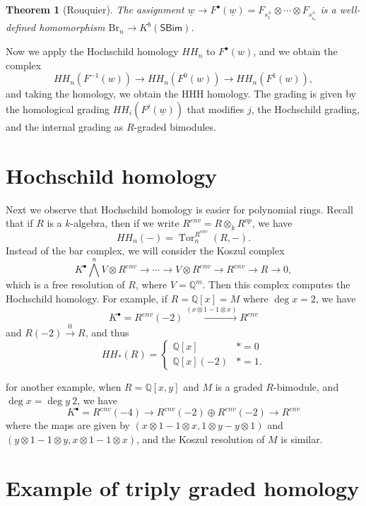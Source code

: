 \documentclass[leqno, openany]{memoir}
\newtheorem{thm}{Theorem}[section]
\theoremstyle{definition}
\theoremstyle{remark}
\theoremstyle{plain}
\theoremstyle{definition}
\theoremstyle{remark}
\newcommand{\Q}{\mathbb{Q}}
\newcommand{\mr}[1]{\mathrm{#1}}
\newcommand{\ms}[1]{\mathsf{#1}}
\newcommand{\ul}[1]{\underline{#1}}
\DeclareMathOperator{\Tor}{Tor}
\begin{document}
\begin{thm}[Rouquier]
    The assignment $\ul{w} \to F^{\bullet}(\ul{w}) = F_{s_1^{\pm}} \otimes \cdots \otimes F_{s_{i_n}^{\pm}}$ is a well-defined homomorphism $\mr{Br}_n \to K^{b}(\ms{SBim})$.
\end{thm}

Now we apply the Hochschild homology $HH_n$ to $F^{\bullet}(w)$, and we obtain the complex
\[ HH_n(F^{-1}(w)) \to HH_n(F^0(w)) \to HH_n(F^1(w)), \]
and taking the homology, we obtain the HHH homology. The grading is given by the homological grading $HH_i(F^j(\ul{w}))$ that modifies $j$, the Hochschild grading, and the internal grading as $R$-graded bimodules.

\section{Hochschild homology}%
\label{sec:hochschild_homology}

Next we observe that Hochschild homology is easier for polynomial rings. Recall that if $R$ is a $k$-algebra, then if we write $R^{env} = R \otimes_k R^{op}$, we have
\[ HH_n(-) = \Tor_n^{R^{env}}(R,-). \]
Instead of the bar complex, we will consider the Koszul complex
\[ K^{\bullet} \bigwedge^n V \otimes R^{env} \to \cdots \to V \otimes R^{env} \to R^{env} \to R \to 0, \]
which is a free resolution of $R$, where $V = \Q^m$. Then this complex computes the Hochschild homology. For example, if $R = \Q[x] = M$ where $\deg x = 2$, we have
\[ K^{\bullet} = R^{env}(-2) \xrightarrow{(x \otimes 1 - 1 \otimes x)} R^{env} \] and $R(-2) \xrightarrow{0} R$, and thus
\[ HH_*(R) = \begin{cases}
    \Q[x] & * = 0 \\ 
    \Q[x](-2) & * = 1.
\end{cases}
\]

for another example, when $R = \Q[x,y]$ and $M$ is a graded $R$-bimodule, and $\deg x = \deg y \ 2$, we have
\[ K^{\bullet} = R^{env}(-4) \to R^{env}(-2) \oplus R^{env}(-2) \to R^{env} \]
where the maps are given by $(x \otimes 1 - 1 \otimes x, 1 \otimes y - y \otimes 1)$ and $(y \otimes 1 - 1 \otimes y, x \otimes 1 - 1 \otimes x)$, and the Koszul resolution of $M$ is similar.

\section{Example of triply graded homology}%
\label{sec:example_of_triply_graded_homology}
\end{document}
